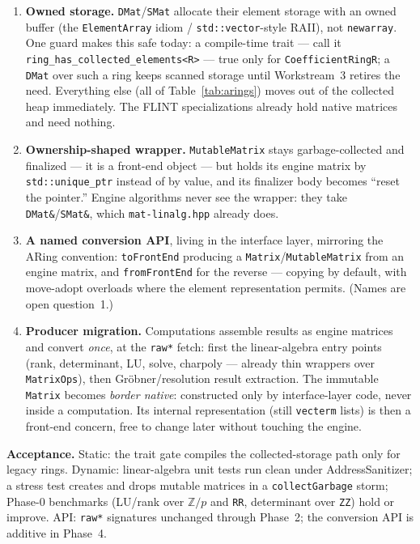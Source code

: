 \documentclass[11pt,oneside]{report}
\newcommand{\code}[1]{\textcolor{m2code}{\texttt{#1}}}
\newcommand{\file}[1]{\textcolor{m2file}{\texttt{#1}}}
\begin{document}
\begin{enumerate}
\item \textbf{Owned storage.} \code{DMat}/\code{SMat} allocate their
  element storage with an owned buffer (the \code{ElementArray} idiom /
  \code{std::vector}-style RAII), not \code{newarray}. One guard makes this
  safe today: a compile-time trait --- call it
  \code{ring\_has\_collected\_elements<R>} --- true only for
  \code{CoefficientRingR}; a \code{DMat} over such a ring keeps scanned
  storage until Workstream~3 retires the need. Everything else (all of
  Table~\ref{tab:arings}) moves out of the collected heap immediately.
  The FLINT specializations already hold native matrices and need nothing.
\item \textbf{Ownership-shaped wrapper.} \code{MutableMatrix} stays
  garbage-collected and finalized --- it is a front-end object --- but
  holds its engine matrix by \code{std::unique\_ptr} instead of by value,
  and its finalizer body becomes ``reset the pointer.'' Engine algorithms
  never see the wrapper: they take \code{DMat\&}/\code{SMat\&}, which
  \file{mat-linalg.hpp} already does.
\item \textbf{A named conversion API}, living in the interface layer,
  mirroring the ARing convention: \code{toFrontEnd} producing a
  \code{Matrix}/\code{MutableMatrix} from an engine matrix, and
  \code{fromFrontEnd} for the reverse --- copying by default, with
  move-adopt overloads where the element representation permits. (Names
  are open question~1.)
\item \textbf{Producer migration.} Computations assemble results as engine
  matrices and convert \emph{once}, at the \code{raw*} fetch: first the
  linear-algebra entry points (rank, determinant, LU, solve, charpoly ---
  already thin wrappers over \code{MatrixOps}), then Gr\"obner/resolution
  result extraction. The immutable \code{Matrix} becomes \emph{border
  native}: constructed only by interface-layer code, never inside a
  computation. Its internal representation (still \code{vecterm} lists) is
  then a front-end concern, free to change later without touching the
  engine.
\end{enumerate}

\textbf{Acceptance.} Static: the trait gate compiles the collected-storage
path only for legacy rings. Dynamic: linear-algebra unit tests run clean
under AddressSanitizer; a stress test creates and drops mutable matrices in
a \code{collectGarbage} storm; Phase-0 benchmarks (LU/rank over
$\mathbb{Z}/p$ and \code{RR}, determinant over \code{ZZ}) hold or improve.
API: \code{raw*} signatures unchanged through Phase~2; the conversion API
is additive in Phase~4.
\end{document}
